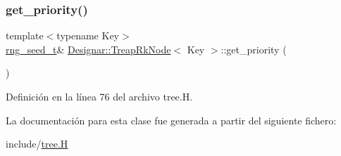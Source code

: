 \subsubsection{\texorpdfstring{get\+\_\+priority()}{get\_priority()}}
{\footnotesize\ttfamily template$<$typename Key$>$ \\
\hyperlink{namespace_designar_ad621b5646d45288c5d6a1e1dfe7531a8}{rng\+\_\+seed\+\_\+t}\& \hyperlink{class_designar_1_1_treap_rk_node}{Designar\+::\+Treap\+Rk\+Node}$<$ Key $>$\+::get\+\_\+priority (\begin{DoxyParamCaption}{ }\end{DoxyParamCaption})\hspace{0.3cm}{\ttfamily [inline]}}



Definición en la línea 76 del archivo tree.\+H.



La documentación para esta clase fue generada a partir del siguiente fichero\+:\begin{DoxyCompactItemize}
\item 
include/\hyperlink{tree_8_h}{tree.\+H}\end{DoxyCompactItemize}
